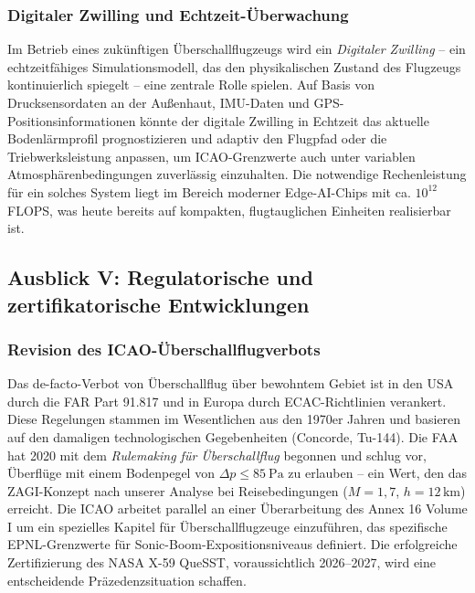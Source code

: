 ﻿\documentclass[12pt,a4paper]{article}
\theoremstyle{definition}
\theoremstyle{remark}
\begin{document}
\subsubsection{Digitaler Zwilling und Echtzeit-Überwachung}

Im Betrieb eines zukünftigen Überschallflugzeugs wird ein \emph{Digitaler Zwilling} --
ein echtzeitfähiges Simulationsmodell, das den physikalischen Zustand des Flugzeugs
kontinuierlich spiegelt -- eine zentrale Rolle spielen. Auf Basis von Drucksensordaten
an der Außenhaut, IMU-Daten und GPS-Positionsinformationen könnte der digitale Zwilling
in Echtzeit das aktuelle Bodenlärmprofil prognostizieren und adaptiv den Flugpfad oder
die Triebwerksleistung anpassen, um ICAO-Grenzwerte auch unter variablen Atmosphärenbedingungen
zuverlässig einzuhalten. Die notwendige Rechenleistung für ein solches System liegt im Bereich
moderner Edge-AI-Chips mit ca. $10^{12}$ FLOPS, was heute bereits auf kompakten,
flugtauglichen Einheiten realisierbar ist.

\subsection{Ausblick V: Regulatorische und zertifikatorische Entwicklungen}
\label{sec:ausblick_regulierung}

\subsubsection{Revision des ICAO-Überschallflugverbots}

Das de-facto-Verbot von Überschallflug über bewohntem Gebiet ist in den USA durch die
FAR Part 91.817 und in Europa durch ECAC-Richtlinien verankert. Diese Regelungen stammen
im Wesentlichen aus den 1970er Jahren und basieren auf den damaligen technologischen
Gegebenheiten (Concorde, Tu-144). Die FAA hat 2020 mit dem \emph{Rulemaking für
Überschallflug} begonnen und schlug vor, Überflüge mit einem Bodenpegel von
$\Delta p \le \SI{85}{\pascal}$ zu erlauben -- ein Wert, den das ZAGI-Konzept
nach unserer Analyse bei Reisebedingungen ($M = 1{,}7$, $h = 12\,\text{km}$) erreicht.
Die ICAO arbeitet parallel an einer Überarbeitung des Annex 16 Volume I um ein
spezielles Kapitel für Überschallflugzeuge einzuführen, das spezifische
EPNL-Grenzwerte für Sonic-Boom-Expositionsniveaus definiert. Die erfolgreiche
Zertifizierung des NASA X-59 QueSST, voraussichtlich 2026--2027, wird eine
entscheidende Präzedenzsituation schaffen.
\end{document}
